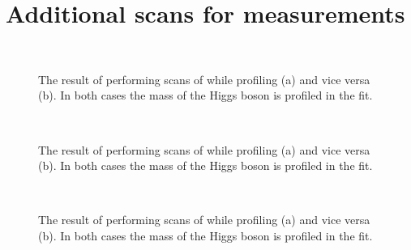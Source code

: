 \chapter{Additional \DNLL scans for measurements}
\label{app:dnll_scans}


\begin{figure}[ht!]
\centering
{} \\
\caption{The result of performing \DNLL scans of \muF while profiling \muV (a) and vice versa (b). In both cases the mass of the Higgs boson is profiled in the fit. }
\label{fig:statandresults:mu_per_rv_and_rf}
\end{figure}

\begin{figure}[ht!]
\centering
{} \\
\caption{The result of performing \DNLL scans of \kf while profiling \kV (a) and vice versa (b). In both cases the mass of the Higgs boson is profiled in the fit. }
\label{fig:statandresults:kappa_per_v_and_f}
\end{figure}

\begin{figure}[ht!]
\centering
{} \\
\caption{The result of performing \DNLL scans of \kGlu while profiling \kPho (a) and vice versa (b). In both cases the mass of the Higgs boson is profiled in the fit. }
\label{fig:statandresults:kappa_per_g_and_g}
\end{figure}
